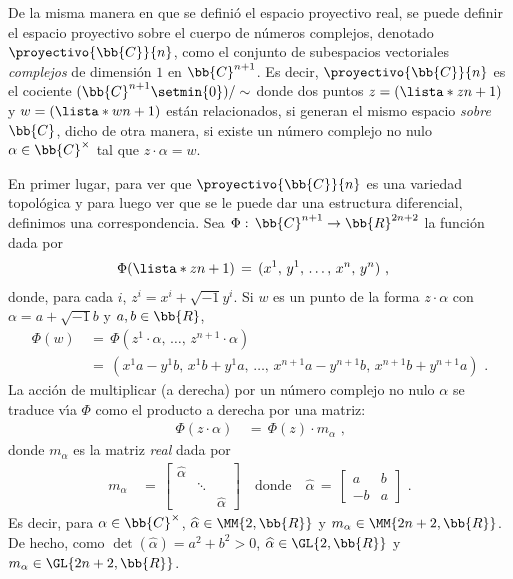 \begin{ejemplo}
	De la misma manera en que se defini\'{o} el espacio proyectivo real,
	se puede definir el espacio proyectivo sobre el cuerpo de n\'{u}meros
	complejos, denotado $\proyectivo{\bb{C}}{n}$, como el conjunto de
	subespacios vectoriales \emph{complejos} de dimensi\'{o}n $1$ en
	$\bb{C}^{n+1}$. Es decir, $\proyectivo{\bb{C}}{n}$ es el
	cociente $(\bb{C}^{n+1}\setmin\{0\})/\sim$ donde dos puntos
	$z=(\lista*{z}{n+1})$ y $w=(\lista*{w}{n+1})$ est\'{a}n relacionados,
	si generan el mismo espacio \emph{sobre $\bb{C}$}, dicho de otra
	manera, si existe un n\'{u}mero complejo no nulo
	$\alpha\in\bb{C}^{\times}$ tal que $z\cdot\alpha=w$.

	En primer lugar, para ver que $\proyectivo{\bb{C}}{n}$ es una variedad
	topol\'{o}gica y para luego ver que se le puede dar una estructura
	diferencial, definimos una correspondencia. Sea
	$\Phi:\,\bb{C}^{n+1}\rightarrow\bb{R}^{2n+2}$ la funci\'{o}n dada por
	\begin{align*}
		\Phi(\lista*{z}{n+1}) & \,=\,
			(x^{1},\,y^{1},\,\dots,\,x^{n},\,y^{n})
		\text{ ,}
	\end{align*}
	donde, para cada $i$, $z^{i}=x^{i}+\sqrt{-1}y^{i}$. Si $w$ es un
	punto de la forma $z\cdot\alpha$ con $\alpha=a+\sqrt{-1}b$ y
	$a,b\in\bb{R}$,
	\begin{align*}
		\Phi(w) & \,=\, \Phi(z^{1}\cdot\alpha,\,\dots,\,
					z^{n+1}\cdot\alpha) \\
		& \,=\,(x^{1}a-y^{1}b,\,x^{1}b+y^{1}a,\,\dots,\,
			x^{n+1}a-y^{n+1}b,\,x^{n+1}b+y^{n+1}a)
		\text{ .}
	\end{align*}
	La acci\'{o}n de multiplicar (a derecha) por un n\'{u}mero complejo
	no nulo $\alpha$ se traduce v\'{\i}a $\Phi$ como el producto a derecha
	por una matriz:
	\begin{align*}
		\Phi(z\cdot\alpha) & \,=\,\Phi(z)\cdot m_{\alpha}
		\text{ ,}
	\end{align*}
	donde $m_{\alpha}$ es la matriz \emph{real} dada por
	\begin{align*}
		m_{\alpha} & \,=\,
			\begin{bmatrix}
				\widehat{\alpha} & & \\
				& \ddots & \\
				& & \widehat{\alpha}
			\end{bmatrix}
		\quad\text{donde}\quad
		\widehat{\alpha} \,=\,
			\begin{bmatrix}
				a & b \\
				-b & a
			\end{bmatrix}
		\text{ .}
	\end{align*}
	Es decir, para $\alpha\in\bb{C}^{\times}$,
	$\widehat{\alpha}\in\MM{2,\bb{R}}$ y $m_{\alpha}\in\MM{2n+2,\bb{R}}$.
	De hecho, como $\det(\widehat{\alpha})=a^{2}+b^{2}>0$,
	$\widehat{\alpha}\in\GL{2,\bb{R}}$ y $m_{\alpha}\in\GL{2n+2,\bb{R}}$.


\end{ejemplo}
